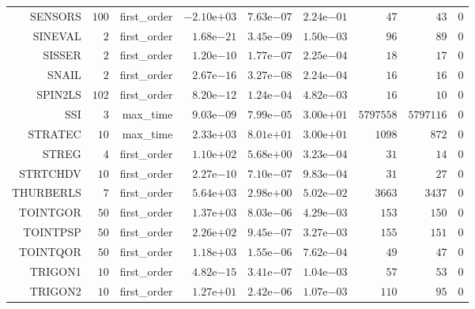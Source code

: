 \begin{longtable}{rrrrrrrrr}
SENSORS & \(   100\) & first\_order & \(-2.10\)e\(+03\) & \( 7.63\)e\(-07\) & \( 2.24\)e\(-01\) & \(    47\) & \(    43\) & \(     0\) \\
SINEVAL & \(     2\) & first\_order & \( 1.68\)e\(-21\) & \( 3.45\)e\(-09\) & \( 1.50\)e\(-03\) & \(    96\) & \(    89\) & \(     0\) \\
SISSER & \(     2\) & first\_order & \( 1.20\)e\(-10\) & \( 1.77\)e\(-07\) & \( 2.25\)e\(-04\) & \(    18\) & \(    17\) & \(     0\) \\
SNAIL & \(     2\) & first\_order & \( 2.67\)e\(-16\) & \( 3.27\)e\(-08\) & \( 2.24\)e\(-04\) & \(    16\) & \(    16\) & \(     0\) \\
SPIN2LS & \(   102\) & first\_order & \( 8.20\)e\(-12\) & \( 1.24\)e\(-04\) & \( 4.82\)e\(-03\) & \(    16\) & \(    10\) & \(     0\) \\
SSI & \(     3\) & max\_time & \( 9.03\)e\(-09\) & \( 7.99\)e\(-05\) & \( 3.00\)e\(+01\) & \(5797558\) & \(5797116\) & \(     0\) \\
STRATEC & \(    10\) & max\_time & \( 2.33\)e\(+03\) & \( 8.01\)e\(+01\) & \( 3.00\)e\(+01\) & \(  1098\) & \(   872\) & \(     0\) \\
STREG & \(     4\) & first\_order & \( 1.10\)e\(+02\) & \( 5.68\)e\(+00\) & \( 3.23\)e\(-04\) & \(    31\) & \(    14\) & \(     0\) \\
STRTCHDV & \(    10\) & first\_order & \( 2.27\)e\(-10\) & \( 7.10\)e\(-07\) & \( 9.83\)e\(-04\) & \(    31\) & \(    27\) & \(     0\) \\
THURBERLS & \(     7\) & first\_order & \( 5.64\)e\(+03\) & \( 2.98\)e\(+00\) & \( 5.02\)e\(-02\) & \(  3663\) & \(  3437\) & \(     0\) \\
TOINTGOR & \(    50\) & first\_order & \( 1.37\)e\(+03\) & \( 8.03\)e\(-06\) & \( 4.29\)e\(-03\) & \(   153\) & \(   150\) & \(     0\) \\
TOINTPSP & \(    50\) & first\_order & \( 2.26\)e\(+02\) & \( 9.45\)e\(-07\) & \( 3.27\)e\(-03\) & \(   155\) & \(   151\) & \(     0\) \\
TOINTQOR & \(    50\) & first\_order & \( 1.18\)e\(+03\) & \( 1.55\)e\(-06\) & \( 7.62\)e\(-04\) & \(    49\) & \(    47\) & \(     0\) \\
TRIGON1 & \(    10\) & first\_order & \( 4.82\)e\(-15\) & \( 3.41\)e\(-07\) & \( 1.04\)e\(-03\) & \(    57\) & \(    53\) & \(     0\) \\
TRIGON2 & \(    10\) & first\_order & \( 1.27\)e\(+01\) & \( 2.42\)e\(-06\) & \( 1.07\)e\(-03\) & \(   110\) & \(    95\) & \(     0\) \\

\end{longtable}
